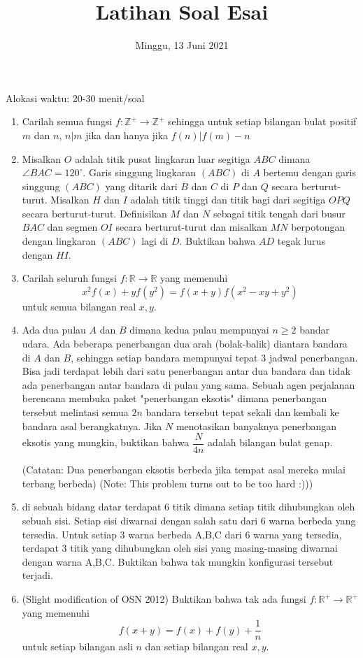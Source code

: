 \documentclass[12pt]{scrartcl}
\title{Latihan Soal Esai}
\date{Minggu, 13 Juni 2021}
\begin{document}
	\maketitle

\renewcommand*\contentsname{Daftar Isi}
\tableofcontents

\newpage
	

Alokasi waktu: 20-30 menit/soal
\begin{enumerate}
	\item Carilah semua fungsi $f:\mathbb{Z^+}\rightarrow\mathbb{Z^+}$ sehingga untuk setiap bilangan bulat positif $m$  dan $n$, $ n|m$ 
	jika dan hanya jika $f(n)| f(m)-n$
	
	
	\item Misalkan $O$ adalah titik pusat lingkaran luar segitiga $ABC$ dimana $\angle BAC = 120^\circ$. Garis singgung lingkaran $(ABC)$ di $A$ bertemu dengan garis singgung $(ABC)$ yang ditarik dari $B$ dan $C$ di $P$ dan $Q$ secara berturut-turut. Misalkan $H$ dan $I$ adalah titik tinggi dan titik bagi dari segitiga $OPQ$ secara berturut-turut. Definisikan $M$ dan $N$ sebagai titik tengah dari busur $BAC$ dan segmen $OI$ secara berturut-turut dan misalkan $MN$ berpotongan dengan lingkaran $(ABC)$ lagi di $D$. Buktikan bahwa $AD$ tegak lurus dengan $HI$.
	
	\item Carilah seluruh fungsi $f:\mathbb{R}\rightarrow\mathbb{R}$ yang memenuhi $$x^2f(x)+yf(y^2)=f(x+y)f(x^2-xy+y^2)$$
	untuk semua bilangan real $x,y$.
	
	
	\item Ada dua pulau $A$ dan $B$ dimana kedua pulau mempunyai $n\ge 2$ bandar udara. Ada beberapa penerbangan dua arah (bolak-balik) diantara bandara di $A$ dan $B$, sehingga setiap bandara mempunyai tepat 3 jadwal penerbangan. Bisa jadi terdapat lebih dari satu penerbangan antar dua bandara dan tidak ada penerbangan antar bandara di pulau yang sama. Sebuah agen perjalanan berencana membuka paket "penerbangan eksotis" dimana penerbangan tersebut melintasi semua $2n$ bandara tersebut tepat sekali dan kembali ke bandara asal berangkatnya. Jika $N$ menotasikan banyaknya penerbangan eksotis yang mungkin, buktikan bahwa $\dfrac{N}{4n}$ adalah bilangan bulat genap.
	
	(Catatan: Dua penerbangan eksotis berbeda jika tempat asal mereka mulai terbang berbeda)
	(Note: This problem turns out to be too hard :)))
	\newpage
	\item di sebuah bidang datar terdapat 6 titik dimana setiap titik dihubungkan oleh sebuah sisi. Setiap sisi diwarnai dengan salah satu dari 6 warna berbeda yang tersedia. Untuk setiap 3 warna berbeda A,B,C dari 6 warna yang tersedia, terdapat 3 titik yang dihubungkan oleh sisi yang masing-masing diwarnai dengan warna A,B,C. Buktikan bahwa tak mungkin konfigurasi tersebut terjadi.
	
	\item (Slight modification of OSN 2012) Buktikan bahwa tak ada fungsi $f:\mathbb{R}^+ \rightarrow \mathbb{R}^+$ yang memenuhi
	$$f(x+y)=f(x)+f(y)+\frac{1}{n}$$ untuk setiap bilangan asli $n$ dan setiap bilangan real $x,y$.
	
\end{enumerate}
\end{document}
